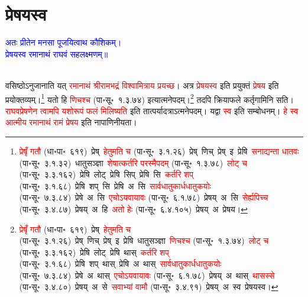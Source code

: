 \section[प्रेषयस्व]{प्रेषयस्व}
\centering\textcolor{blue}{अतः प्रीतेन मनसा पूजयित्वाथ कौशिकम्।\nopagebreak\\
प्रेषयस्व रमानाथं राघवं सहलक्ष्मणम्॥}\nopagebreak\\
\\
\fontsize{14}{21}\selectfont\begin{sloppypar}\justifying\noindent\hspace{10mm} वसिष्ठोऽनुजानाति यत् \textcolor{red}{रमा\-नाथं श्रीराम\-भद्रं विश्वामित्राय प्रयच्छ}। अत्र \textcolor{red}{प्रेषयस्व} इति प्रयुक्तं \textcolor{red}{प्रेषय} इति प्रयोक्तव्यम्।\footnote{\textcolor{red}{प्रेषृँ गतौ} (धा॰पा॰~६१९)~\arrow प्रेष्~\arrow \textcolor{red}{हेतुमति च} (पा॰सू॰~३.१.२६)~\arrow प्रेष्~णिच्~\arrow प्रेष्~इ~\arrow प्रेषि~\arrow \textcolor{red}{सनाद्यन्ता धातवः} (पा॰सू॰~३.१.३२)~\arrow धातुसञ्ज्ञा~\arrow \textcolor{red}{शेषात्कर्तरि परस्मैपदम्} (पा॰सू॰~१.३.७८)~\arrow \textcolor{red}{लोट् च} (पा॰सू॰~३.३.१६२)~\arrow प्रेषि~लोट्~\arrow प्रेषि~सिप्~\arrow प्रेषि~सि~\arrow \textcolor{red}{कर्तरि शप्} (पा॰सू॰~३.१.६८)~\arrow प्रेषि~शप्~सि~\arrow प्रेषि~अ~सि~\arrow \textcolor{red}{सार्वधातुकार्धधातुकयोः} (पा॰सू॰~७.३.८४)~\arrow प्रेषे~अ~सि~\arrow \textcolor{red}{एचोऽयवायावः} (पा॰सू॰~६.१.७८)~\arrow प्रेषय्~अ~सि~\arrow \textcolor{red}{सेर्ह्यपिच्च} (पा॰सू॰~३.४.८७)~\arrow प्रेषय्~अ~हि~\arrow \textcolor{red}{अतो हेः} (पा॰सू॰~६.४.१०५)~\arrow प्रेषय्~अ~\arrow प्रेषय।} यतो हि \textcolor{red}{णिचश्च} (पा॰सू॰~१.३.७४) इत्यात्मनेपदम्।\footnote{\textcolor{red}{प्रेषृँ गतौ} (धा॰पा॰~६१९)~\arrow प्रेष्~\arrow \textcolor{red}{हेतुमति च} (पा॰सू॰~३.१.२६)~\arrow प्रेष्~णिच्~\arrow प्रेष्~इ~\arrow प्रेषि~\arrow धातुसञ्ज्ञा~\arrow \textcolor{red}{णिचश्च} (पा॰सू॰~१.३.७४)~\arrow \textcolor{red}{लोट् च} (पा॰सू॰~३.३.१६२)~\arrow प्रेषि~लोट्~\arrow प्रेषि~थास्~\arrow \textcolor{red}{कर्तरि शप्} (पा॰सू॰~३.१.६८)~\arrow प्रेषि~शप्~थास्~\arrow प्रेषि~अ~थास्~\arrow \textcolor{red}{सार्वधातुकार्ध\-धातुकयोः} (पा॰सू॰~७.३.८४)~\arrow प्रेषे~अ~थास्~\arrow \textcolor{red}{एचोऽयवायावः} (पा॰सू॰~६.१.७८)~\arrow प्रेषय्~अ~थास्~\arrow \textcolor{red}{थासस्से} (पा॰सू॰~३.४.८०)~\arrow प्रेषय्~अ~से~\arrow \textcolor{red}{सवाभ्यां वामौ} (पा॰सू॰~३.४.९१)~\arrow प्रेषय्~अ~स्व~\arrow प्रेषयस्व।} तदपि क्रिया\-फले कर्तृ\-गामिनि सति। \textcolor{red}{राघव\-प्रेषणेन त्वामपि यशो\-रूपं फलं मिलिष्यति} इति तात्पर्यादत्राऽत्मनेपदम्। यद्वा \textcolor{red}{स्व} इति सम्बोधनम्। \textcolor{red}{हे स्व आत्मीय रमा\-नाथं रामं प्रेषय} इति नापाणिनीयता।\end{sloppypar}
